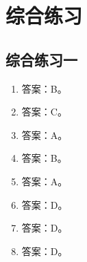 \chapter{综合练习}
\section{综合练习一}

\begin{enumerate}
\item 答案：B。

\item 答案：C。

\item 答案：A。

\item 答案：B。

\item 答案：A。

\item 答案：D。

\item 答案：D。

\item 答案：D。


\end{enumerate}
